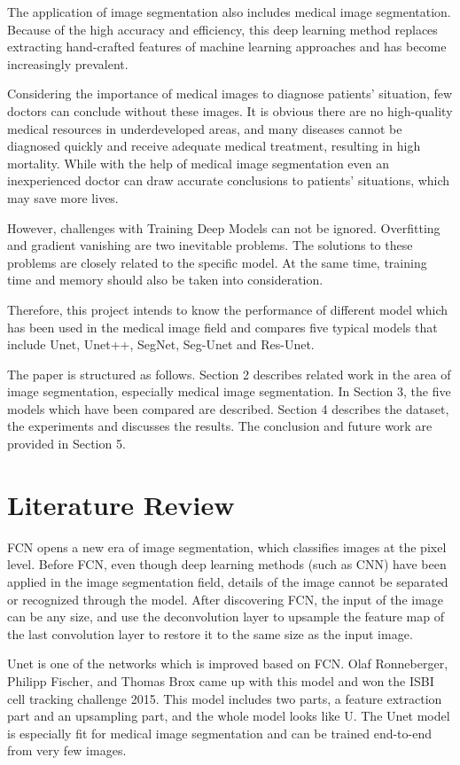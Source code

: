 \documentclass{article}
\begin{document}
The application of image segmentation also includes medical image segmentation.
Because of the high accuracy and efficiency, this deep learning method replaces extracting hand-crafted features of machine learning approaches and has become increasingly prevalent.\cite{hesamian2019deep}

Considering the importance of medical images to diagnose patients' situation, few doctors can conclude without these images.
It is obvious there are no high-quality medical resources in underdeveloped areas, and many diseases cannot be diagnosed quickly and receive adequate medical treatment, resulting in high mortality.
While with the help of medical image segmentation even an inexperienced doctor can draw accurate conclusions to patients' situations, which may save more lives.\cite{jin2019dunet}

However, challenges with Training Deep Models can not be ignored.
Overfitting and gradient vanishing are two inevitable problems.
The solutions to these problems are closely related to the specific model.
At the same time, training time and memory should also be taken into consideration.

Therefore, this project intends to know the performance of different model which has been used in the medical image field and compares five typical models that include Unet, Unet++, SegNet, Seg-Unet and Res-Unet.

The paper is structured as follows.
Section 2 describes related work in the area of image segmentation, especially medical image segmentation.
In Section 3, the five models which have been compared are described.
Section 4 describes the dataset, the experiments and discusses the results.
The conclusion and future work are provided in Section 5.

\section{Literature Review}
FCN opens a new era of image segmentation, which classifies images at the pixel level.
Before FCN, even though deep learning methods (such as CNN) have been applied in the image segmentation field, details of the image cannot be separated or recognized through the model.
After discovering FCN, the input of the image can be any size, and use the deconvolution layer to upsample the feature map of the last convolution layer to restore it to the same size as the input image. \cite{Long_2015_CVPR}

Unet is one of the networks which is improved based on FCN.
Olaf Ronneberger, Philipp Fischer, and Thomas Brox came up with this model and won the ISBI cell tracking challenge 2015.
This model includes two parts, a feature extraction part and an upsampling part, and the whole model looks like U.
The Unet model is especially fit for medical image segmentation and can be trained end-to-end from very few images.\cite{DBLP:journals/corr/RonnebergerFB15}
\end{document}
